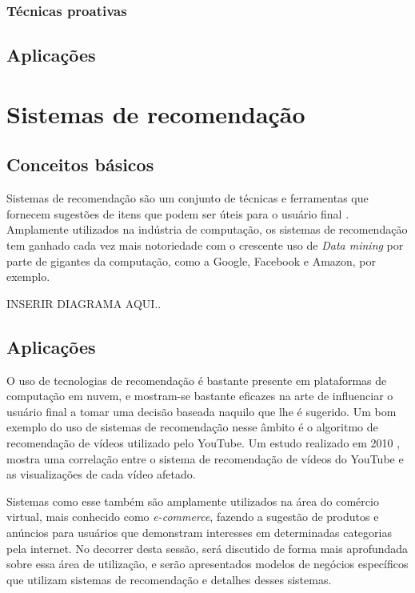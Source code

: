 \documentclass[
	12pt,				%
	openright,			%
	twoside,			%
	a4paper,			%
	english,			%
	french,				%
	spanish,			%
	brazil				%
	]{abntex2}
\begin{document}
\subsubsection{Técnicas proativas}




\subsection{Aplicações}




\section{Sistemas de recomendação}\label{sec_recom}

\cite{andrade2019taxonomia}

\subsection{Conceitos básicos}

Sistemas de recomendação são um conjunto de técnicas e ferramentas que fornecem sugestões de itens que podem ser úteis para o usuário final \cite{resnick1997recommender} \cite{good1999combining} \cite{burke2007hybrid}. Amplamente utilizados na indústria de computação, os sistemas de recomendação tem ganhado cada vez mais notoriedade com o crescente uso de \emph{Data mining} por parte de gigantes da computação, como a Google, Facebook e Amazon, por exemplo.

INSERIR DIAGRAMA AQUI..



\subsection{Aplicações}

O uso de tecnologias de recomendação é bastante presente em plataformas de computação em nuvem, e mostram-se bastante eficazes na arte de influenciar o usuário final a tomar uma decisão baseada naquilo que lhe é sugerido. Um bom exemplo do uso de sistemas de recomendação nesse âmbito é o algoritmo de recomendação de vídeos utilizado pelo YouTube. Um estudo realizado em 2010 \cite{zhou2010impact}, mostra uma correlação entre o sistema de recomendação de vídeos do YouTube e as visualizações de cada vídeo afetado.

Sistemas como esse também são amplamente utilizados na área do comércio virtual, mais conhecido como \emph{e-commerce}, fazendo a sugestão de produtos e anúncios para usuários que demonstram interesses em determinadas categorias pela internet. No decorrer desta sessão, será discutido de forma mais aprofundada sobre essa área de utilização, e serão apresentados modelos de negócios específicos que utilizam sistemas de recomendação e detalhes desses sistemas. %
\end{document}
